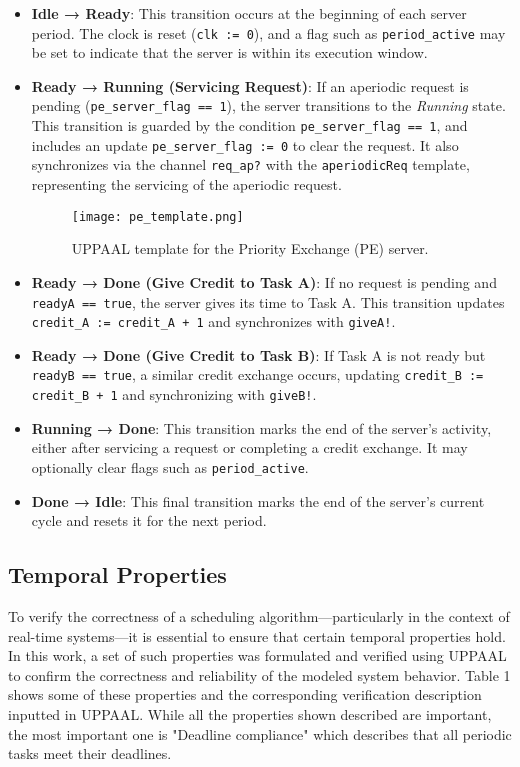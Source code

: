 \documentclass[conference]{IEEEtran}
\begin{document}
\begin{itemize}
    \item \textbf{Idle → Ready}:  
    This transition occurs at the beginning of each server period. The clock is reset (\texttt{clk := 0}), and a flag such as \texttt{period\_active} may be set to indicate that the server is within its execution window.

    \item \textbf{Ready → Running (Servicing Request)}:  
    If an aperiodic request is pending (\texttt{pe\_server\_flag == 1}), the server transitions to the \textit{Running} state. This transition is guarded by the condition \texttt{pe\_server\_flag == 1}, and includes an update \texttt{pe\_server\_flag := 0} to clear the request.  
    It also synchronizes via the channel \texttt{req\_ap?} with the \texttt{aperiodicReq} template, representing the servicing of the aperiodic request.

    \begin{figure*}[t]
    \centering
    \texttt{[image: pe\_template.png]}
    \caption{UPPAAL template for the Priority Exchange (PE) server.}
    \label{fig:pe_template}
  \end{figure*}


    \item \textbf{Ready → Done (Give Credit to Task A)}:  
    If no request is pending and \texttt{readyA == true}, the server gives its time to Task A. This transition updates \texttt{credit\_A := credit\_A + 1} and synchronizes with \texttt{giveA!}.

    \item \textbf{Ready → Done (Give Credit to Task B)}:  
    If Task A is not ready but \texttt{readyB == true}, a similar credit exchange occurs, updating \texttt{credit\_B := credit\_B + 1} and synchronizing with \texttt{giveB!}.

    \item \textbf{Running → Done}:  
    This transition marks the end of the server's activity, either after servicing a request or completing a credit exchange. It may optionally clear flags such as \texttt{period\_active}.

    \item \textbf{Done → Idle}:  
    This final transition marks the end of the server’s current cycle and resets it for the next period.
\end{itemize}

\subsection{Temporal Properties}
To verify the correctness of a scheduling algorithm—particularly in the context of real-time systems—it is essential to ensure that certain temporal properties hold. In this work, a set of such properties was formulated and verified using UPPAAL to confirm the correctness and reliability of the modeled system behavior. Table 1 shows some of these properties and the corresponding verification description inputted in UPPAAL. While all the properties shown described are important, the most important one is "Deadline compliance" which describes that all periodic tasks meet their deadlines.
\end{document}
